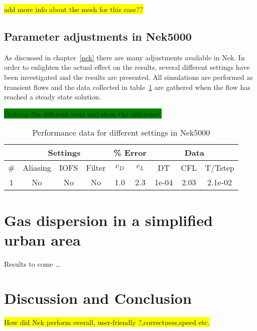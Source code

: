 \colorbox{yellow}{add more info about the mesh for this case??}

\subsection{Parameter adjustments in Nek5000}
As discussed in chapter~\ref{nek} there are many adjustments available in Nek. 
In order to enlighten the actual effect on the results, several different settings have 
been investigated and the results are presented. All simulations are performed as 
transient flows and the data collected in table~\ref{tab:perf} are gathered when the 
flow has reached a steady state solution. 

\colorbox{green}{Perform the different tests and show the difference.}

\begin{table}[h]
    \centering
    \begin{tabular}{c | c c c | c c | c c c}

         & \multicolumn{3}{|c|}{Settings} & \multicolumn{2}{|c|}{\% Error} & \multicolumn{3}{|c}{Data} \\\hline
         \#  & Aliasing & IOFS & Filter & $c_D$ & $c_L$ 
         & DT & CFL & T/Tstep \\ \hline 
         1 & No & No & No & 1.0 & 2.3 & 1e-04 & 2.03 & 2.1e-02 \\
    \end{tabular}
    \caption{Performance data for different settings in Nek5000}
    \label{tab:perf}
\end{table}
\section{Gas dispersion in a simplified urban area} 
Results to come \ldots 

\section{Discussion and Conclusion}
\colorbox{yellow}{How did Nek perform overall, user-friendly ?,correctness,speed etc.}

